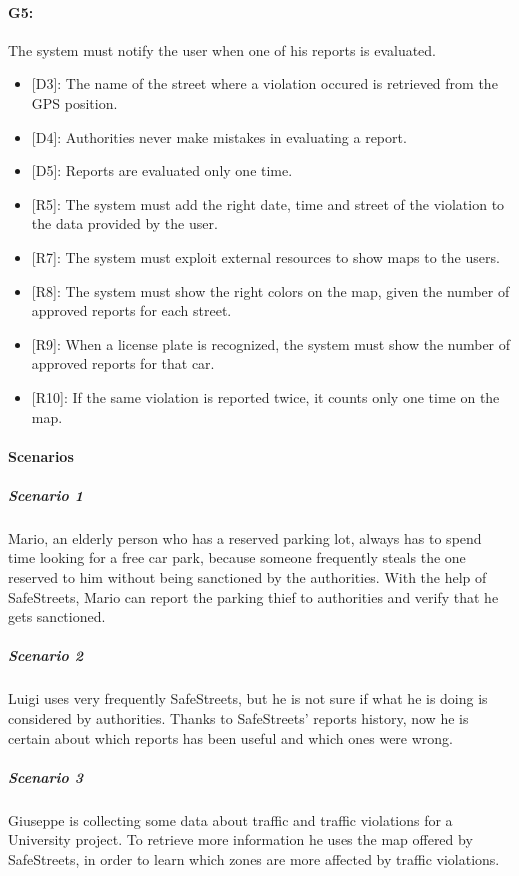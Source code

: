 \documentclass[12pt,a4paper]{report}
\begin{document}
			\paragraph {G5:} The system must notify the user when one of his reports is evaluated.
			\begin{itemize}
				\item{[D3]:} The name of the street where a violation occured is retrieved from the GPS position.
				\item{[D4]:} Authorities never make mistakes in evaluating a report.
				\item{[D5]:} Reports are evaluated only one time.
			\end{itemize}
			\begin{itemize}
				\item{[R5]:} The system must add the right date, time and street of the violation to the data provided by the user.
				\item{[R7]:} The system must exploit external resources to show maps to the users.
				\item{[R8]:} The system must show the right colors on the map, given the number of approved reports for each street.
				\item{[R9]:} When a license plate is recognized, the system must show the number of approved reports for that car.
				\item{[R10]:} If the same violation is reported twice, it counts only one time on the map.
			\end{itemize}

\paragraph{Scenarios}

				\subparagraph{Scenario 1}
					Mario, an elderly person who has a reserved parking lot, always has to spend time looking for a free
					car park, because someone frequently steals the one reserved to him without being sanctioned by the
					authorities. With the help of SafeStreets, Mario can report the parking thief to authorities and verify
					that he gets sanctioned.
					
				\subparagraph{Scenario 2}
					Luigi uses very frequently SafeStreets, but he is not sure if what he is doing is considered by authorities.
					Thanks to SafeStreets' reports history, now he is certain about which reports has been useful and which ones
					were wrong.
					
				\subparagraph{Scenario 3}
					Giuseppe is collecting some data about traffic and traffic violations for a University project. To retrieve more
					information he uses the map offered by SafeStreets, in order to learn which zones are more affected by traffic violations.
					
\end{document}
